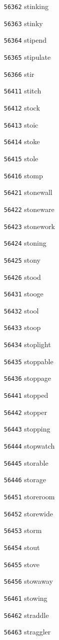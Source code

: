 \documentclass[twoside,11pt]{article}
\begin{document}
\begin{multicols}{5}
\begin{enumerate}
\item[\texttt{56362}] stinking
\item[\texttt{56363}] stinky
\item[\texttt{56364}] stipend
\item[\texttt{56365}] stipulate
\item[\texttt{56366}] stir
\item[\texttt{56411}] stitch
\item[\texttt{56412}] stock
\item[\texttt{56413}] stoic
\item[\texttt{56414}] stoke
\item[\texttt{56415}] stole
\item[\texttt{56416}] stomp
\item[\texttt{56421}] stonewall
\item[\texttt{56422}] stoneware
\item[\texttt{56423}] stonework
\item[\texttt{56424}] stoning
\item[\texttt{56425}] stony
\item[\texttt{56426}] stood
\item[\texttt{56431}] stooge
\item[\texttt{56432}] stool
\item[\texttt{56433}] stoop
\item[\texttt{56434}] stoplight
\item[\texttt{56435}] stoppable
\item[\texttt{56436}] stoppage
\item[\texttt{56441}] stopped
\item[\texttt{56442}] stopper
\item[\texttt{56443}] stopping
\item[\texttt{56444}] stopwatch
\item[\texttt{56445}] storable
\item[\texttt{56446}] storage
\item[\texttt{56451}] storeroom
\item[\texttt{56452}] storewide
\item[\texttt{56453}] storm
\item[\texttt{56454}] stout
\item[\texttt{56455}] stove
\item[\texttt{56456}] stowaway
\item[\texttt{56461}] stowing
\item[\texttt{56462}] straddle
\item[\texttt{56463}] straggler

\end{enumerate}
\end{multicols}
\end{document}
